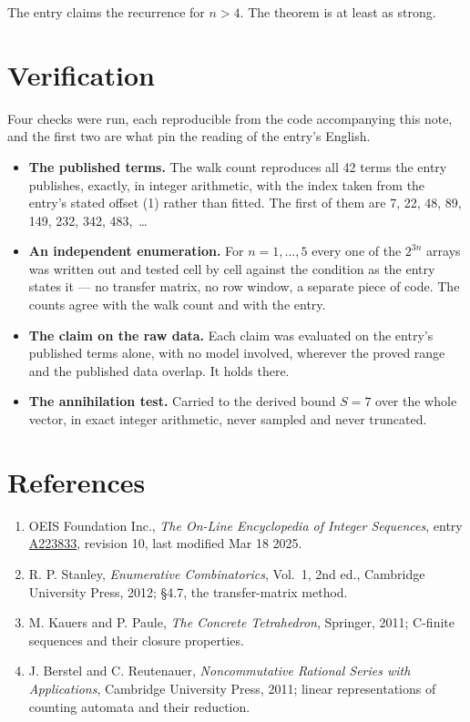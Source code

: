 \documentclass[11pt]{article}
\theoremstyle{definition}
\begin{document}
The entry claims the recurrence for $n > 4$. The theorem is at least as strong.

\section{Verification}

Four checks were run, each reproducible from the code accompanying this note, and the first two are what pin the reading of the entry's English.

\begin{itemize}

\item {\bfseries The published terms.} The walk count reproduces all 42 terms the entry publishes, exactly, in integer arithmetic, with the index taken from the entry's stated offset (1) rather than fitted. The first of them are 7, 22, 48, 89, 149, 232, 342, 483,~\dots

\item {\bfseries An independent enumeration.} For $n = 1,\dots,5$ every one of the $2^{3n}$ arrays was written out and tested cell by cell against the condition as the entry states it --- no transfer matrix, no row window, a separate piece of code. The counts agree with the walk count and with the entry.

\item {\bfseries The claim on the raw data.} Each claim was evaluated on the entry's published terms alone, with no model involved, wherever the proved range and the published data overlap. It holds there.

\item {\bfseries The annihilation test.} Carried to the derived bound $S = 7$ over the whole vector, in exact integer arithmetic, never sampled and never truncated.

\end{itemize}

\section{References}

\begin{enumerate}

\item OEIS Foundation Inc., \emph{The On-Line Encyclopedia of Integer Sequences}, entry \href{https://oeis.org/A223833}{A223833}, revision 10, last modified Mar 18 2025.

\item R. P. Stanley, \emph{Enumerative Combinatorics}, Vol.~1, 2nd ed., Cambridge University Press, 2012; \S4.7, the transfer-matrix method.

\item M. Kauers and P. Paule, \emph{The Concrete Tetrahedron}, Springer, 2011; C-finite sequences and their closure properties.

\item J. Berstel and C. Reutenauer, \emph{Noncommutative Rational Series with Applications}, Cambridge University Press, 2011; linear representations of counting automata and their reduction.

\end{enumerate}
\end{document}
